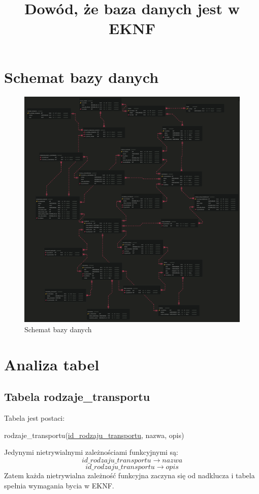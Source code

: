\documentclass[a4paper,12pt]{mwart}
\begin{document}
    \title{Dowód, że baza danych jest w EKNF}

\maketitle
\section{Schemat bazy danych}
\begin{figure}[h!]
    \centering

    \includegraphics[scale=0.1]{baza_danych_fullsize.png}
    \caption{Schemat bazy danych}
\end{figure}
\section{Analiza tabel}
\subsection{Tabela rodzaje\_transportu}
Tabela jest postaci:

rodzaje\_transportu(\underline{id\_rodzaju\_transportu}, nazwa, opis)

\noindent Jedynymi nietrywialnymi zależnościami funkcyjnymi są:
$$   id\_rodzaju\_transportu  \rightarrow nazwa $$
$$   id\_rodzaju\_transportu  \rightarrow opis$$
Zatem każda nietrywialna zależność funkcyjna zaczyna się od nadklucza i tabela  spełnia wymagania bycia w EKNF.
\end{document}
